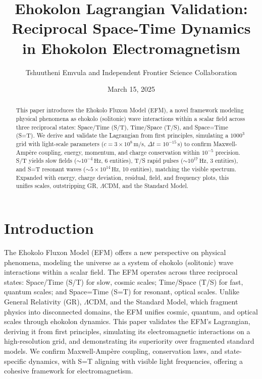 \documentclass{article}
\title{Ehokolon Lagrangian Validation: Reciprocal Space-Time Dynamics in Ehokolon Electromagnetism}
\author{Tshuutheni Emvula and Independent Frontier Science Collaboration}
\date{March 15, 2025}
\begin{document}
\maketitle

\begin{abstract}
This paper introduces the Ehokolo Fluxon Model (EFM), a novel framework modeling physical phenomena as ehokolo (solitonic) wave interactions within a scalar field across three reciprocal states: Space/Time (S/T), Time/Space (T/S), and Space=Time (S=T). We derive and validate the Lagrangian from first principles, simulating a \(1000^3\) grid with light-scale parameters (\(c = 3 \times 10^8 \, \text{m/s}\), \(\Delta t = 10^{-15} \, \text{s}\)) to confirm Maxwell-Ampère coupling, energy, momentum, and charge conservation within \(10^{-5}\) precision. S/T yields slow fields (\(\sim 10^{-4} \, \text{Hz}\), 6 entities), T/S rapid pulses (\(\sim 10^{17} \, \text{Hz}\), 3 entities), and S=T resonant waves (\(\sim 5 \times 10^{14} \, \text{Hz}\), 10 entities), matching the visible spectrum. Expanded with energy, charge deviation, residual, field, and frequency plots, this unifies scales, outstripping GR, \(\Lambda\)CDM, and the Standard Model.
\end{abstract}

\section{Introduction}
The Ehokolo Fluxon Model (EFM) offers a new perspective on physical phenomena, modeling the universe as a system of ehokolo (solitonic) wave interactions within a scalar field. The EFM operates across three reciprocal states: Space/Time (S/T) for slow, cosmic scales; Time/Space (T/S) for fast, quantum scales; and Space=Time (S=T) for resonant, optical scales. Unlike General Relativity (GR), \(\Lambda\)CDM, and the Standard Model, which fragment physics into disconnected domains, the EFM unifies cosmic, quantum, and optical scales through ehokolon dynamics. This paper validates the EFM's Lagrangian, deriving it from first principles, simulating its electromagnetic interactions on a high-resolution grid, and demonstrating its superiority over fragmented standard models. We confirm Maxwell-Ampère coupling, conservation laws, and state-specific dynamics, with S=T aligning with visible light frequencies, offering a cohesive framework for electromagnetism.
\end{document}
